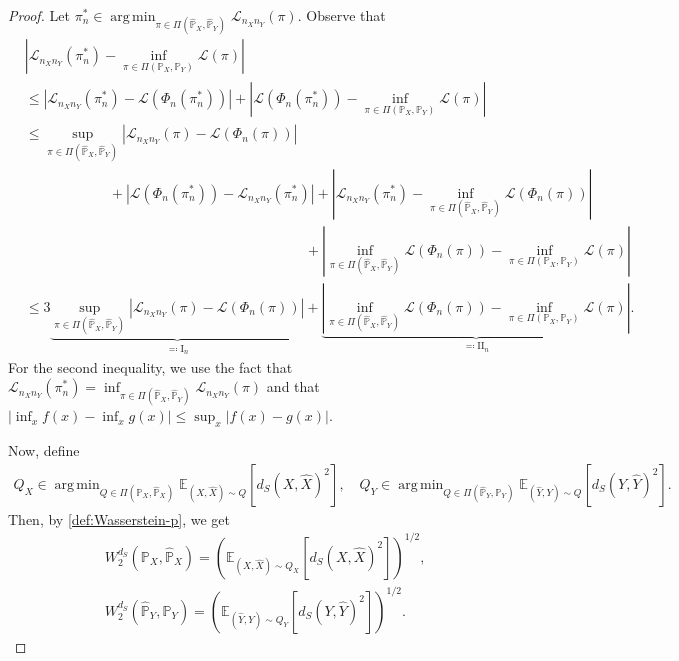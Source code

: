 \documentclass{article}
\DeclareMathOperator*{\argmin}{arg\,min}
\begin{document}
\begin{proof}
	Let $\pi^\ast_n \in \argmin_{\pi \in \Pi(\hat{\mathbb{P}}_X,\hat{\mathbb{P}}_Y)} \mathcal{L}_{n_Xn_Y}(\pi)$. Observe that
	\begin{align*}
		&\left\vert \mathcal{L}_{n_Xn_Y}(\pi^\ast_n) - \inf_{\pi \in \Pi(\mathbb{P}_X,\mathbb{P}_Y)} \mathcal{L}(\pi) \right\vert \\
		&\leq \left\vert \mathcal{L}_{n_Xn_Y}(\pi^\ast_n) - \mathcal{L}(\Phi_n(\pi^\ast_n)) \right\vert + \left\vert \mathcal{L}(\Phi_n(\pi^\ast_n)) - \inf_{\pi \in \Pi(\mathbb{P}_X,\mathbb{P}_Y)} \mathcal{L}(\pi) \right\vert \\[5pt]
		&\leq \sup_{\pi \in \Pi(\hat{\mathbb{P}}_X,\hat{\mathbb{P}}_Y)} \left\vert \mathcal{L}_{n_Xn_Y}(\pi) - \mathcal{L}(\Phi_n(\pi)) \right\vert \\
		&\qquad\qquad\qquad + \left\vert \mathcal{L}(\Phi_n(\pi^\ast_n)) -  \mathcal{L}_{n_Xn_Y}(\pi^\ast_n) \right\vert + \left\vert \mathcal{L}_{n_Xn_Y}(\pi^\ast_n) - \inf_{\pi \in \Pi(\hat{\mathbb{P}}_X,\hat{\mathbb{P}}_Y)} \mathcal{L}(\Phi_n(\pi)) \right\vert \\
		&\qquad\qquad\qquad\qquad\qquad\qquad\qquad\qquad\qquad\qquad + \left\vert \inf_{\pi \in \Pi(\hat{\mathbb{P}}_X,\hat{\mathbb{P}}_Y)} \mathcal{L}(\Phi_n(\pi)) - \inf_{\pi \in \Pi(\mathbb{P}_X,\mathbb{P}_Y)} \mathcal{L}(\pi) \right\vert \\
		&\leq 3\underbrace{\sup_{\pi \in \Pi(\hat{\mathbb{P}}_X,\hat{\mathbb{P}}_Y)} \left\vert \mathcal{L}_{n_Xn_Y}(\pi) - \mathcal{L}(\Phi_n(\pi)) \right\vert}_{\eqqcolon \mathrm{I}_n} + \underbrace{\left\vert \inf_{\pi \in \Pi(\hat{\mathbb{P}}_X,\hat{\mathbb{P}}_Y)} \mathcal{L}(\Phi_n(\pi)) - \inf_{\pi \in \Pi(\mathbb{P}_X,\mathbb{P}_Y)} \mathcal{L}(\pi) \right\vert}_{\eqqcolon \mathrm{II}_n} .
	\end{align*}
	For the second inequality, we use the fact that $\mathcal{L}_{n_Xn_Y}(\pi^\ast_n) = \inf_{\pi \in \Pi(\hat{\mathbb{P}}_X,\hat{\mathbb{P}}_Y)} \mathcal{L}_{n_Xn_Y}(\pi)$ and that $|\inf_x f(x) - \inf_x g(x)| \leq \sup_x |f(x) - g(x)|$.
	
	Now, define
	\begin{align}
		\label{eq:conditional-glue}
		Q_X \in \argmin_{Q \in \Pi(\mathbb{P}_X,\hat{\mathbb{P}}_X)} \mathbb{E}_{(X,\hat{X}) \sim Q}\left[d_S(X,\hat{X})^2\right] , \quad Q_Y \in \argmin_{Q \in \Pi(\hat{\mathbb{P}}_Y,\mathbb{P}_Y)} \mathbb{E}_{(\hat{Y},Y) \sim Q}\left[d_S(Y,\hat{Y})^2\right] .
	\end{align}
	Then, by \cref{def:Wasserstein-p}, we get
	\begin{align*}
		&W_2^{d_S}(\mathbb{P}_X,\hat{\mathbb{P}}_X) = \left(\mathbb{E}_{(X,\hat{X}) \sim Q_X}\left[d_S(X,\hat{X})^2\right]\right)^{1/2} , \\
		&W_2^{d_S}(\hat{\mathbb{P}}_Y,\mathbb{P}_Y) = \left(\mathbb{E}_{(\hat{Y},Y) \sim Q_Y}\left[d_S(Y,\hat{Y})^2\right]\right)^{1/2} .
	\end{align*}
	

\end{proof}
\end{document}
